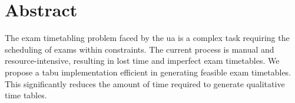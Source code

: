 
\section*{Abstract}

The exam timetabling problem faced by the \acrfull{ua} is a complex task requiring the scheduling of exams within constraints. The current process is manual and resource-intensive, resulting in lost time and imperfect exam timetables. We propose a \acrlong{tabu} implementation efficient in generating feasible exam timetables. This significantly reduces the amount of time required to generate qualitative time tables.
